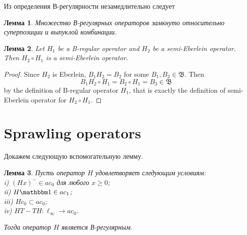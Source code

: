 \documentclass[a4paper,14pt]{article} %
\newcommand{\N}{\ensuremath{\mathbb{N}}}
\newcommand{\B}{\ensuremath{\mathfrak{B}}}
\newcommand{\one}{\ensuremath{\mathbbm 1}}
\theoremstyle{plain}
\newtheorem{lemma}{Лемма}[section]
\begin{document}
Из определения В-регулярности незамедлительно следует

\begin{lemma}
	\label{lem:B-regular_superposition_and_addition}
	Множество В-регулярных операторов замкнуто относительно суперпозиции и выпуклой комбинации.
\end{lemma}

\begin{lemma}
	Let $H_1$ be a B-regular operator and $H_2$ be a semi-Eberlein operator.
	Then $H_2 \circ H_1$ is a semi-Eberlein operator.
\end{lemma}
\begin{proof}
	Since $H_2$ is Eberlein, $B_1H_2 = B_2$ for some $B_1,B_2\in\B$.
	Then
	\begin{equation}
		B_1 H_2 \circ H_1 = B_2 \circ H_1 = B_3
		\in \B
	\end{equation}
	by the definition of B-regular operator $H_1$,
	that is exactly the definition of semi-Eberlein operator for $H_2 \circ H_1$.
\end{proof}



\section{Sprawling operators}





	Докажем следующую вспомогательную лемму.

	\begin{lemma}
		\label{lem:suff_B_reg}
		Пусть оператор $H$ удовлетворяет следующим условиям:
		\\i)   $(Hx)^- \in ac_0$ для любого $x\geq 0$;
		\\ii)  $H\one\in ac_1$;
		\\iii) $H c_0 \subset ac_0$;
		\\iv)  $HT-TH : \ell_\infty \to ac_0$.%

		Тогда оператор $H$ является В-регулярным.
	\end{lemma}




\end{document}
